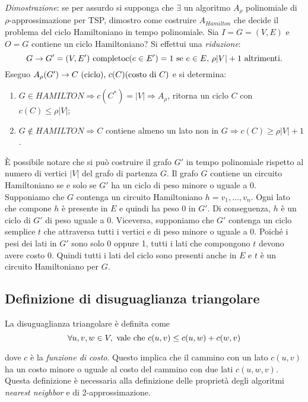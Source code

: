 \textit{Dimostrazione}: se per assurdo si supponga che $\exists$ un algoritmo $A_\rho$
polinomiale di $\rho$-approssimazione per TSP, dimostro come costruire $A_{Hamilton}$
che decide il problema del ciclo Hamiltoniano in tempo polinomiale. Sia $I = G =(V,E)$
e $O = G$ contiene un ciclo Hamiltoniano? Si effettui una \textit{riduzione}:
\[
    G \rightarrow G' = (V, E') \textnormal{ completo}
    c(e \in E') = 1 \textnormal{ se } e \in E \textnormal{, } \rho|V| + 1 \textnormal{ altrimenti.}
\]
Eseguo $A_\rho(G') \rightarrow C \textnormal{ (ciclo), } c(C) \textnormal{(costo di $C$)}$ e si
determina:
\begin{enumerate}
\item $G \in HAMILTON \Rightarrow c(C^*) = |V| \Rightarrow A_\rho$, ritorna un ciclo $C$
con $c(C) \le \rho|V|$;
\item $G \not\in HAMILTON \Rightarrow C$ contiene almeno un lato non in
$G \Rightarrow c(C) \ge \rho|V| + 1$.
\end{enumerate}

È possibile notare che si può costruire il grafo $G'$ in tempo polinomiale rispetto al numero
di vertici $|V|$ del grafo di partenza $G$. Il grafo $G$ contiene un circuito Hamiltoniano se e
solo se $G'$ ha un ciclo di peso minore o uguale a 0. Supponiamo che $G$ contenga un circuito
Hamiltoniano $h = v_1, ..., v_n$. Ogni lato che compone $h$ è presente in $E$ e quindi ha peso 0 in $G'$.
Di conseguenza, $h$ è un ciclo di $G'$ di peso uguale a 0. Viceversa, supponiamo che $G'$ contenga un ciclo
semplice $t$ che attraversa tutti i vertici e di peso minore o uguale a 0. Poiché i pesi dei lati
in $G'$ sono solo 0 oppure 1, tutti i lati che compongono $t$ devono avere costo 0. Quindi tutti i
lati del ciclo sono presenti anche in $E$ e $t$ è un circuito Hamiltoniano per $G$.

\subsection{Definizione di disuguaglianza triangolare}

La disuguaglianza triangolare è definita come
\begin{equation}
    \forall u, v, w \in V, \textnormal{ vale che } c(u, v) \le c(u, w) + c(w, v)
\end{equation}

dove $c$ è la \textit{funzione di costo}. Questo implica che il cammino con un lato $c(u, v)$ ha un costo
minore o uguale al costo del cammino con due lati $c(u, w, v)$. \\

Questa definizione è necessaria alla definizione delle proprietà degli algoritmi \textit{nearest neighbor} e di 2-approssimazione.